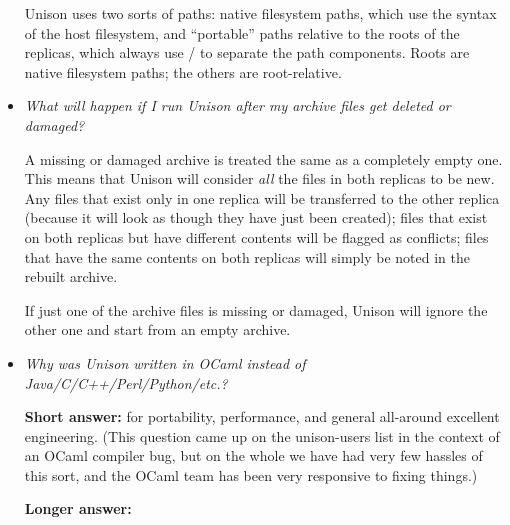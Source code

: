 \begin{itemize}
Unison uses two sorts of paths: native filesystem paths, which use the
syntax of the host filesystem, and ``portable'' paths relative to the
roots of the replicas, which always use / to separate the path
components.  Roots are native filesystem paths; the others are
root-relative.




\item {\em What will happen if I run Unison after my archive files get
  deleted or damaged?}

A missing or damaged archive is treated the same as a completely empty
one.  This means that Unison will consider {\em all} the files in both
replicas to be new.  Any files that exist only in one replica will be
transferred to the other replica (because it will look as though they
have just been created); files that exist on both replicas but have
different contents will be flagged as conflicts; files that have the same
contents on both replicas will simply be noted in the rebuilt archive.

If just one of the archive files is missing or damaged, Unison will
ignore the other one and start from an empty archive.

\item {\em Why was Unison written in OCaml instead of
  Java/C/C++/Perl/Python/etc.?} 
 
{\bf Short answer:} for portability, performance, and general all-around
excellent engineering. (This question came up on the unison-users list in
the context of an OCaml compiler bug, but on the whole we have had very few
hassles of this sort, and the OCaml team has been very responsive to fixing
things.)
 
{\bf Longer answer:}
 

\end{itemize}
